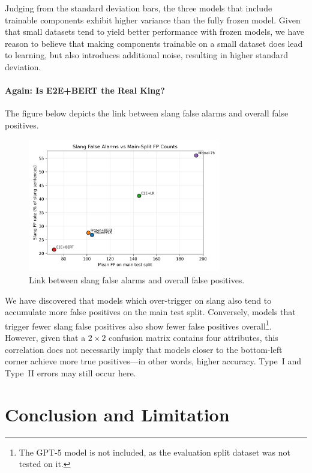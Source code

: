 \documentclass[12pt]{article}
\begin{document}
Judging from the standard deviation bars, the three models that include trainable components exhibit higher variance than the fully frozen model. 
Given that small datasets tend to yield better performance with frozen models, we have reason to believe that making components trainable on a small dataset does lead to learning, but also introduces additional noise, resulting in higher standard deviation.

\paragraph{Again: Is E2E+BERT the Real King?}

The figure below depicts the link between slang false alarms and overall false positives.

\begin{figure}[H]
    \centering
    \includegraphics[width=0.75\textwidth]{figures/slang_fp_vs_main_fp.png}
    \caption{Link between slang false alarms and overall false positives.}
    \label{fig:slang-fp-correlation}
\end{figure}

We have discovered that models which over-trigger on slang also tend to accumulate more false positives on the main test split. 
Conversely, models that trigger fewer slang false positives also show fewer false positives overall\footnote{The GPT-5 model is not included, as the evaluation split dataset was not tested on it.}. 
However, given that a $2 \times 2$ confusion matrix contains four attributes, this correlation does not necessarily imply that models closer to the bottom-left corner achieve more true positives\;---\;in other words, higher accuracy. 
Type~I and Type~II errors may still occur here.

\section{Conclusion and Limitation}
\end{document}

